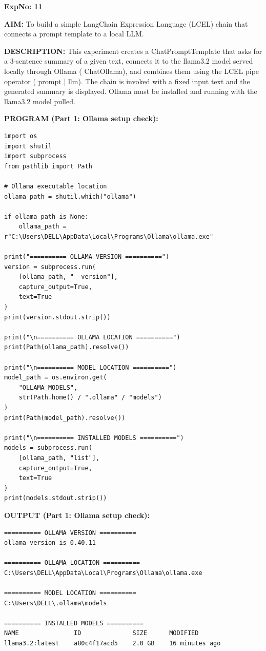 \documentclass[10pt,a4paper]{article}
\newcommand{\code}[1]{{\ttfamily\hyphenchar\font=-1 #1}}
\newcommand{\sectionlabel}[1]{\par\vspace{3pt}\noindent\textbf{#1}\par\nopagebreak}
\begin{document}
\clearpage

\noindent\textbf{ExpNo: 11}

\noindent\textbf{AIM:} To build a simple LangChain Expression Language (LCEL) chain that connects a prompt template to a local LLM.

\noindent\textbf{DESCRIPTION:} This experiment creates a \code{ChatPromptTemplate} that asks for a 3-sentence summary of a given text, connects it to the \code{llama3.2} model served locally through Ollama (\code{ChatOllama}), and combines them using the LCEL pipe operator (\code{prompt | llm}). The chain is invoked with a fixed input text and the generated summary is displayed. Ollama must be installed and running with the \code{llama3.2} model pulled.

\sectionlabel{PROGRAM (Part 1: Ollama setup check):}
\begin{lstlisting}[style=code]
import os
import shutil
import subprocess
from pathlib import Path

# Ollama executable location
ollama_path = shutil.which("ollama")

if ollama_path is None:
    ollama_path = r"C:\Users\DELL\AppData\Local\Programs\Ollama\ollama.exe"

print("========== OLLAMA VERSION ==========")
version = subprocess.run(
    [ollama_path, "--version"],
    capture_output=True,
    text=True
)
print(version.stdout.strip())

print("\n========== OLLAMA LOCATION ==========")
print(Path(ollama_path).resolve())

print("\n========== MODEL LOCATION ==========")
model_path = os.environ.get(
    "OLLAMA_MODELS",
    str(Path.home() / ".ollama" / "models")
)
print(Path(model_path).resolve())

print("\n========== INSTALLED MODELS ==========")
models = subprocess.run(
    [ollama_path, "list"],
    capture_output=True,
    text=True
)
print(models.stdout.strip())
\end{lstlisting}

\sectionlabel{OUTPUT (Part 1: Ollama setup check):}
\begin{lstlisting}[style=output]
========== OLLAMA VERSION ==========
ollama version is 0.40.11

========== OLLAMA LOCATION ==========
C:\Users\DELL\AppData\Local\Programs\Ollama\ollama.exe

========== MODEL LOCATION ==========
C:\Users\DELL\.ollama\models

========== INSTALLED MODELS ==========
NAME               ID              SIZE      MODIFIED
llama3.2:latest    a80c4f17acd5    2.0 GB    16 minutes ago
\end{lstlisting}
\end{document}
